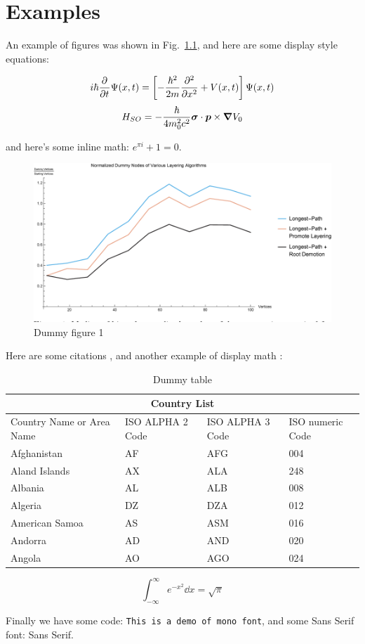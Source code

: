 \chapter{Examples}
\label{c:examples}

An example of figures was shown in Fig.\ \ref{fig:dummy1}, and here are some
display style equations:

\begin{equation*}
	i \hbar \pdv[]{}{t} \Psi (x, t) = \left[ -\frac{\hbar^2}{2m} \pdv[2]{}{x}
	+ V(x, t) \right] \Psi (x, t)
\end{equation*}
\begin{equation*}
	H_{SO} = - \frac{\hbar}{4 m_0^2 c^2} \boldsymbol{\sigma} \cdot \boldsymbol{p}
	\times \grad V_0
\end{equation*}


and here's some inline math: $ e^{\pi i} + 1 = 0$.


\begin{figure}[bt]
	\centering
	\includegraphics[width=0.6\linewidth]{./figures/dummy1.png}
	\caption{Dummy figure 1}%
	\label{fig:dummy1}
\end{figure}

\noindent Here are some citations \cite{einstein, latexcompanion}, and another 
example of display math \cite{knuthwebsite}:

\begin{table}[tb]
\centering
\caption{Dummy table}
\label{tab:dummy_tab}
\begin{tabular}{ |p{3cm}||p{3cm}|p{3cm}|p{3cm}|  }
 \hline
 \multicolumn{4}{|c|}{Country List} \\
 \hline
 Country Name     or Area Name& ISO ALPHA 2 Code &ISO ALPHA 3 Code&ISO numeric Code\\
 \hline
 Afghanistan   & AF    &AFG&   004\\
 Aland Islands&   AX  & ALA   &248\\
 Albania &AL & ALB&  008\\
 Algeria    &DZ & DZA&  012\\
 American Samoa&   AS  & ASM&016\\
 Andorra& AD  & AND   &020\\
 Angola& AO  & AGO&024\\
 \hline
\end{tabular} 
\end{table}

\begin{equation}
	\int_{-\infty}^\infty e^{-x^2} \dd x = \sqrt{\pi}
\end{equation}

Finally we have some code: \texttt{This is a demo of mono font}, and some
Sans Serif font: \textsf{Sans Serif}.

